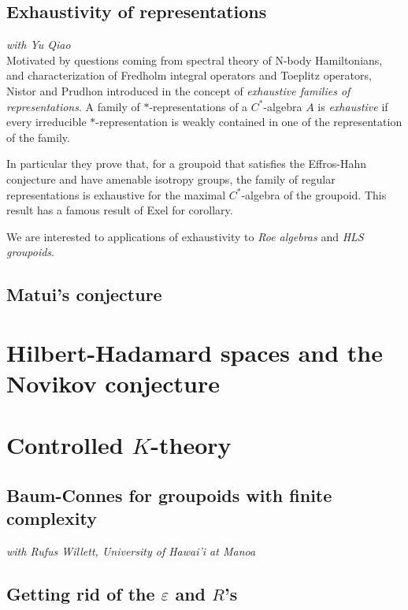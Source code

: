 \subsection*{Exhaustivity of representations}

\textit{with Yu Qiao}\\

Motivated by questions coming from spectral theory of N-body Hamiltonians, and characterization of Fredholm integral operators and Toeplitz operators, Nistor and Prudhon introduced in \cite{NistorPrudhon} the concept of \textit{exhaustive families of representations}. A family of $*$-representations of a $C^*$-algebra $A$ is \textit{exhaustive} if every irreducible $*$-representation is weakly contained in one of the representation of the family.

In particular they prove that, for a groupoid that satisfies the Effros-Hahn conjecture and have amenable isotropy groups, the family of regular representations is exhaustive for the maximal $C^*$-algebra of the groupoid. This result has a famous result of Exel \cite{Exel} for corollary.

We are interested to applications of exhaustivity to \textit{Roe algebras} and \textit{HLS groupoids}. 
 
\subsection*{Matui's conjecture}


\section{Hilbert-Hadamard spaces and the Novikov conjecture}

\section{Controlled $K$-theory}

\subsection*{Baum-Connes for groupoids with finite complexity}

\textit{with Rufus Willett, University of Hawai'i at Manoa}\\

\subsection*{Getting rid of the $\varepsilon$ and $R$'s}
